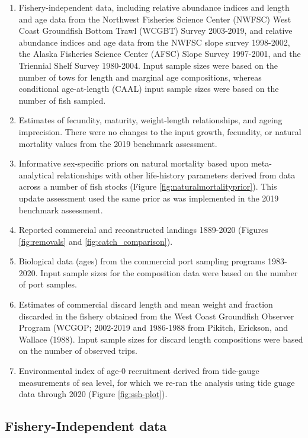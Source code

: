 \documentclass[11pt,
  english,
  a4paper,
]{article}
\begin{document}
\begin{enumerate}
\item Fishery-independent data, including relative abundance indices and length and age data from the 
Northwest Fisheries Science Center (NWFSC) West Coast Groundfish Bottom Trawl (WCGBT) Survey 2003-2019, and relative abundance indices and age data from the NWFSC slope survey 1998-2002, the Alaska Fisheries Science Center (AFSC) Slope Survey 1997-2001, and the Triennial Shelf Survey 1980-2004. Input sample sizes were based on the number of tows for length and marginal age compositions, whereas conditional age-at-length (CAAL) input sample sizes were based on the number of fish sampled. 
\item Estimates of fecundity, maturity, weight-length relationships, and ageing imprecision. There were no changes to the input growth, fecundity, or natural mortality values from the 2019 benchmark assessment.
\item Informative sex-specific priors on natural mortality based upon meta-analytical 
relationships with other life-history parameters derived from data across a number of fish stocks 
(Figure \ref{fig:naturalmortalityprior}). This update assessment used the same prior as was implemented in the 2019 benchmark assessment.
\item Reported commercial and reconstructed landings 1889-2020 (Figures \ref{fig:removals} and \ref{fig:catch_comparison}).
\item Biological data (ages) from the commercial port sampling programs 1983-2020. Input sample sizes for the composition data were based on the number of port samples.
\item Estimates of commercial discard length and mean weight and fraction discarded in the fishery obtained from the West Coast Groundfish Observer Program (WCGOP; 2002-2019 and 1986-1988 from Pikitch, Erickson, and Wallace (1988). Input sample sizes for discard length compositions were based on the number of observed trips. 
\item Environmental index of age-0 recruitment derived from tide-gauge measurements of sea level, for which we re-ran the analysis using tide guage data through 2020 (Figure \ref{fig:ssh-plot}).
\end{enumerate}


\hypertarget{fishery-independent-data}{%
\subsection{Fishery-Independent data}\label{fishery-independent-data}}
\end{document}
